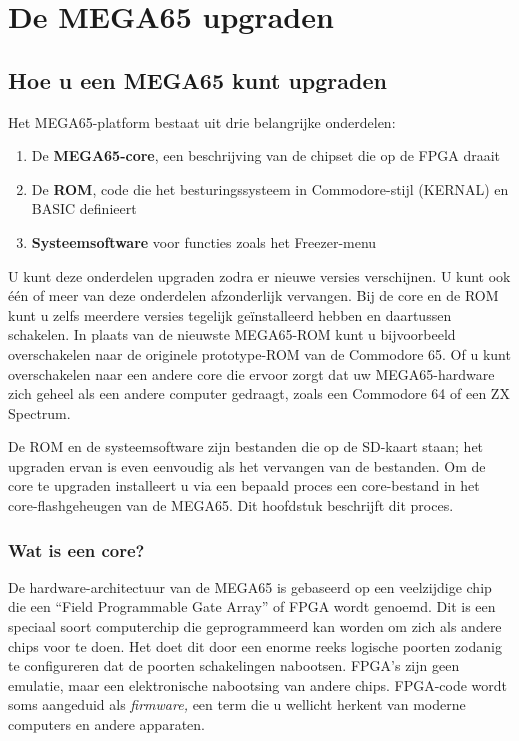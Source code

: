 \chapter{De MEGA65 upgraden}

\section{Hoe u een MEGA65 kunt upgraden}
\label{cha:cores}

Het MEGA65-platform bestaat uit drie belangrijke onderdelen:

\begin{enumerate}
  \item De {\bf MEGA65-core}, een beschrijving van de chipset die op de FPGA draait  \item De {\bf ROM}, code die het besturingssysteem in Commodore-stijl (KERNAL) en BASIC definieert  \item {\bf Systeemsoftware} voor functies zoals het Freezer-menu
\end{enumerate}

U kunt deze onderdelen upgraden zodra er nieuwe versies verschijnen. U kunt ook één of meer van deze onderdelen afzonderlijk vervangen. Bij de core en de ROM kunt u zelfs meerdere versies tegelijk geïnstalleerd hebben en daartussen schakelen. In plaats van de nieuwste MEGA65-ROM kunt u bijvoorbeeld overschakelen naar de originele prototype-ROM van de Commodore 65. Of u kunt overschakelen naar een andere core die ervoor zorgt dat uw MEGA65-hardware zich geheel als een andere computer gedraagt, zoals een Commodore 64 of een ZX Spectrum.

De ROM en de systeemsoftware zijn bestanden die op de SD-kaart staan; het upgraden ervan is even eenvoudig als het vervangen van de bestanden. Om de core te upgraden installeert u via een bepaald proces een core-bestand in het core-flashgeheugen van de MEGA65. Dit hoofdstuk beschrijft dit proces.

\subsection{Wat is een core?}

De hardware-architectuur van de MEGA65 is gebaseerd op een veelzijdige chip die een ``Field Programmable Gate Array'' of FPGA wordt genoemd. Dit is een speciaal soort computerchip die geprogrammeerd kan worden om zich als andere chips voor te doen. Het doet dit door een enorme reeks logische poorten zodanig te configureren dat de poorten schakelingen nabootsen. FPGA's zijn geen emulatie, maar een elektronische nabootsing van andere chips. FPGA-code wordt soms aangeduid als {\em firmware,} een term die u wellicht herkent van moderne computers en andere apparaten.

